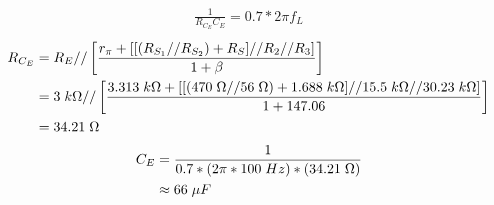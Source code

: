 \documentclass{article}
\begin{document}
	\begin{align*}
		\frac{1}{R_{C_E} C_E} = 0.7 * 2\pi f_L
	\end{align*}
	\begin{align*}
		R_{C_E} &= R_E // \left[\frac{r_{\pi} + [[({R_{S_1}} // R_{S_2}) + R_S] // R_2 // R_3]}{1 + \beta}\right]\\
		&= 3 \hspace{1mm} k\Omega // \left[\frac{3.313 \hspace{1mm} k\Omega + [[(470 \hspace{1mm} \Omega // 56 \hspace{1mm} \Omega) + 1.688 \hspace{1mm} k\Omega] // 15.5 \hspace{1mm} k\Omega // 30.23 \hspace{1mm} k\Omega]}{1 + 147.06} \right]\\		
		&= 34.21 \hspace{1mm} \Omega
	\end{align*}
	\begin{align*}
		C_E &= \frac{1}{0.7 * (2\pi * 100 \hspace{1mm} Hz) * (34.21 \hspace{1mm} \Omega)}\\
		&\approx 66 \hspace{1mm} \mu F\\
	\end{align*}
\end{document}
